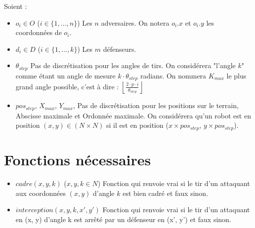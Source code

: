 \documentclass[12pt]{article}
\begin{document}
Soient :
\begin{itemize}
\item $o_i \in O$ ($i \in \{1,..., n\}$) Les $n$ adversaires. On notera $o_i.x$ et $o_i.y$ les coordonnées de $o_i$.
\item $d_i \in D$ ($i \in \{1,..., k\}$) Les $m$ défenseurs.
\item $\theta_{step}$ Pas de discrétisation pour les angles de tirs. On considérera "l'angle $k$" comme étant un angle de mesure $k \cdot \theta_{step}$ radians. On nommera $K_{max}$ le plus grand angle possible, c'est à dire :  $\left \lfloor{\frac{2\cdot p \cdot i }{\theta_{step}}}\right \rfloor $
\item $pos_{step}$, $X_{max}$, $Y_{max}$, Pas de discrétisation pour les positions sur le terrain, Abscisse  maximale et Ordonnée maximale. On considérera qu'un robot est en position $(x, y) \in (N \times N)$ si il est en position ($x \times pos_{step}$, $y \times pos_{step}$).
\end{itemize}

\section{Fonctions nécessaires}
\begin{itemize}
\item $cadre(x, y, k)$ ($x, y, k \in N$) Fonction qui renvoie vrai si le tir d'un attaquant aux coordonnées $(x, y)$ d'angle $k$ est bien cadré et faux sinon.
\item $interception(x, y, k, x', y')$ Fonction qui renvoie vrai si le tir d'un attaquant en (x, y) d'angle k est arrêté par un défenseur en (x', y') et faux sinon.
\end{itemize}
\space
\space
\end{document}
